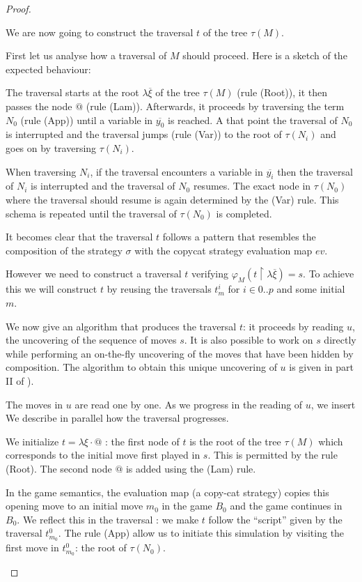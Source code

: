 \begin{proof}
\begin{itemize}
    We are now going to construct the traversal $t$ of the
    tree $\tau(M)$.

    First let us analyse how a traversal of $M$ should proceed.
    Here is a sketch of the expected behaviour:

    The traversal starts at the root $\lambda \overline{\xi}$ of the tree $\tau(M)$ (rule
    (Root)), it then passes the node $@$ (rule (Lam)). Afterwards, it proceeds by traversing the term $N_0$ (rule (App))
    until a variable in $\overline{y_0}$ is reached. A that point the traversal
    of $N_0$ is interrupted and the traversal jumps (rule (Var)) to the root of $\tau(N_i)$ and goes on by traversing $\tau(N_i)$.

    When traversing $N_i$, if the traversal encounters a variable in $\overline{y_i}$ then the traversal of $N_i$ is interrupted and
    the traversal of $N_0$ resumes. The exact node in $\tau(N_0)$ where the traversal should resume is again determined by the (Var) rule.
    This schema is repeated until the traversal of $\tau(N_0)$ is completed.

    It becomes clear that the traversal $t$ follows a pattern that resembles the composition of the strategy $\sigma$
    with the copycat strategy evaluation map $ev$.

    However we need to construct a traversal $t$ verifying $\varphi_M(t \upharpoonright \lambda \overline{\xi}) =
    s$. To achieve this we will construct $t$ by reusing the traversals $t^i_m$ for $i \in 0..p$ and some initial $m$.


    We now give an algorithm that produces the traversal $t$: it proceeds by reading $u$, the uncovering of the sequence of moves $s$.
    It is also possible to work on $s$ directly while performing an on-the-fly uncovering of the moves that have been hidden by
    composition. The algorithm to obtain this unique uncovering of $u$ is given in part II of \cite{hylandong_pcf}).

    The moves in $u$ are read one by one. As we progress in the reading of $u$, we insert
 We describe in parallel how the traversal progresses.


    We initialize $t = \lambda \xi \cdot @$ : the first node of $t$ is the
    root of the tree $\tau(M)$ which corresponds to the initial move
    first played in $s$. This is permitted by the rule (Root). The
    second node $@$ is added using the (Lam) rule.

    In the game semantics, the evaluation map (a copy-cat strategy) copies this opening move to an initial move $m_0$ in the game
    $B_0$ and the game continues in $B_0$. We reflect this in the traversal : we make $t$ follow
    the ``script'' given by the traversal $t^0_{m_0}$.
    The rule (App) allow us to initiate this simulation
    by visiting the  first move in $t^0_{m_0}$: the root of $\tau(N_0)$.


\end{itemize}
\end{proof}
